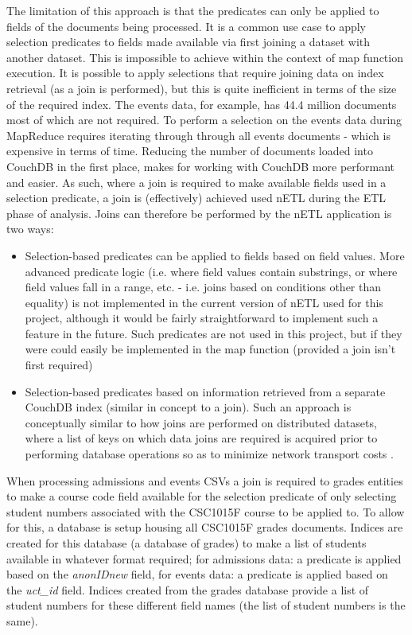 The limitation of this approach is that the predicates can only be applied to fields of the documents being processed. It is a common use case to apply selection predicates to fields made available via first joining a dataset with another dataset. This is impossible to achieve within the context of map function execution. It is possible to apply selections that require joining data on index retrieval (as a join is performed), but this is quite inefficient in terms of the size of the required index. The events data, for example, has 44.4 million documents most of which are not required. To perform a selection on the events data during MapReduce requires iterating through through all events documents - which is expensive in terms of time. Reducing the number of documents loaded into CouchDB in the first place, makes for working with CouchDB more performant and easier. As such, where a join is required to make available fields used in a selection predicate, a join is (effectively) achieved used nETL during the ETL phase of analysis. Joins can therefore be performed by the nETL application is two ways:

\begin{itemize}
  \item Selection-based predicates can be applied to fields based on field values. More advanced predicate logic (i.e. where field values contain substrings, or where field values fall in a range, etc. - i.e. joins based on conditions other than equality) is not implemented in the current version of nETL used for this project, although it would be fairly straightforward to implement such a feature in the future. Such predicates are not used in this project, but if they were could easily be implemented in the map function (provided a join isn't first required)
  \item Selection-based predicates based on information retrieved from a separate CouchDB index (similar in concept to a join). Such an approach is conceptually similar to how joins are performed on distributed datasets, where a list of keys on which data joins are required is acquired prior to performing database operations so as to minimize network transport costs \cite{sonia2018}.
\end{itemize}

When processing admissions and events CSVs a join is required to grades entities to make a course code field available for the selection predicate of only selecting student numbers associated with the CSC1015F course to be applied to. To allow for this, a database is setup housing all CSC1015F grades documents. Indices are created for this database (a database of grades) to make a list of students available in whatever format required; for admissions data: a predicate is applied based on the \textit{anonIDnew} field, for events data: a predicate is applied based on the \textit{uct\_id} field. Indices created from the grades database provide a list of student numbers for these different field names (the list of student numbers is the same).

